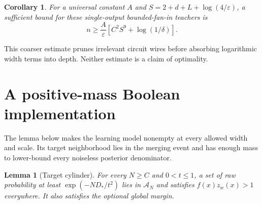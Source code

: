 \documentclass[11pt]{article}
\newtheorem{lemma}[theorem]{Lemma}
\newtheorem{corollary}[theorem]{Corollary}
\begin{document}
\begin{corollary}\label{cor:literal}
For a universal constant $A$ and $S=2+d+L+\log(4/\varepsilon)$, a sufficient bound for these single-output bounded-fan-in teachers is
\[
 n\ge\frac A\varepsilon\left[C^2S^9+\log(1/\delta)\right].
\]
\end{corollary}
This coarser estimate prunes irrelevant circuit wires before absorbing logarithmic width terms into depth. Neither estimate is a claim of optimality.

\section{A positive-mass Boolean implementation}
The lemma below makes the learning model nonempty at every allowed width and scale. Its target neighborhood lies in the merging event and has enough mass to lower-bound every noiseless posterior denominator.
\begin{lemma}[Target cylinder]\label{lem:cylinder}
For every $N\ge C$ and $0<t\le1$, a set of raw probability at least $\exp(-ND_*/t^2)$ lies in $\mathcal A_N$ and satisfies $f(x)z_w(x)>1$ everywhere. It also satisfies the optional global margin.
\end{lemma}
\end{document}

